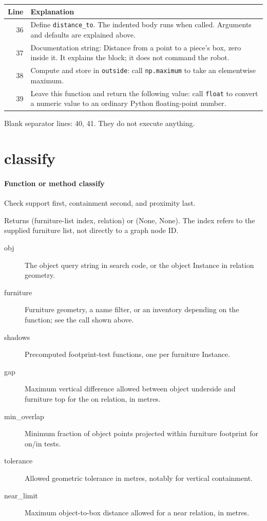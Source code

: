 \documentclass[11pt,a4paper]{book}
\begin{document}
\begin{longtable}{r p{}}

\textbf{Line} & \textbf{Explanation} \\ \hline \endhead

36 & Define \texttt{distance\_to}. The indented body runs when called. Arguments and defaults are explained above. \\

37 & Documentation string: Distance from a point to a piece's box, zero inside it. It explains the block; it does not command the robot. \\

38 & Compute and store in \texttt{outside}: call \texttt{np.maximum} to take an elementwise maximum.  \\

39 & Leave this function and return the following value: call \texttt{float} to convert a numeric value to an ordinary Python floating-point number. \\

\end{longtable}

Blank separator lines: 40, 41. They do not execute anything.

\section{classify}

\paragraph{Function or method classify}
Check support first, containment second, and proximity last.

Returns (furniture-list index, relation) or (None, None). The index refers to the supplied furniture list, not directly to a graph node ID.

\begin{description}
\item[obj] The object query string in search code, or the object Instance in relation geometry.
\item[furniture] Furniture geometry, a name filter, or an inventory depending on the function; see the call shown above.
\item[shadows] Precomputed footprint-test functions, one per furniture Instance.
\item[gap] Maximum vertical difference allowed between object underside and furniture top for the on relation, in metres.
\item[min\_overlap] Minimum fraction of object points projected within furniture footprint for on/in tests.
\item[tolerance] Allowed geometric tolerance in metres, notably for vertical containment.
\item[near\_limit] Maximum object-to-box distance allowed for a near relation, in metres.
\end{description}
\end{document}
